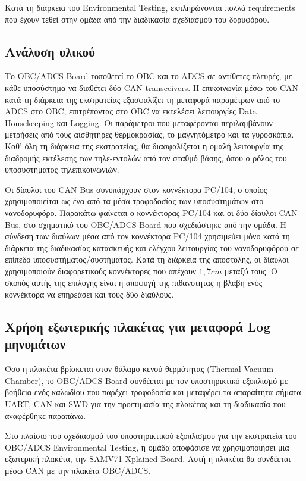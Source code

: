 \documentclass[a4paper,nobib,justified]{tufte-book}
\begin{document}
Κατά τη διάρκεια του Environmental Testing, εκπληρώνονται πολλά requirements που έχουν τεθεί στην ομάδα από την διαδικασία σχεδιασμού του δορυφόρου.
\subsection{Ανάλυση υλικού}
Το OBC/ADCS Board τοποθετεί το OBC και το ADCS σε αντίθετες πλευρές, με κάθε υποσύστημα να διαθέτει δύο CAN transceivers. Η επικοινωνία μέσω του CAN κατά τη διάρκεια της εκστρατείας εξασφαλίζει τη μεταφορά παραμέτρων από το ADCS στο OBC, επιτρέποντας στο OBC να εκτελέσει λειτουργίες Data Housekeeping και Logging. Οι παράμετροι που μεταφέρονται περιλαμβάνουν μετρήσεις από τους αισθητήρες θερμοκρασίας, το μαγνητόμετρο και τα γυροσκόπια. Καθ' όλη τη διάρκεια της εκστρατείας, θα διασφαλίζεται η ομαλή λειτουργία της διαδρομής εκτέλεσης των τηλε-εντολών από τον σταθμό βάσης, όπου ο ρόλος του υποσυστήματος τηλεπικοινωνιών.

Οι δίαυλοι του CAN Bus συνυπάρχουν στον κοννέκτορα PC/104, ο οποίος χρησιμοποιείται ως ένα από τα μέσα τροφοδοσίας των υποσυστημάτων στο νανοδορυφόρο. Παρακάτω φαίνεται ο κοννέκτορας PC/104 και οι δύο δίαυλοι CAN Bus, στο σχηματικό του OBC/ADCS Board που σχεδιάστηκε από την ομάδα. Η σύνδεση των διαύλων μέσα από τον κοννέκτορα PC/104 χρησιμεύει μόνο κατά τη διάρκεια της διαδικασίας κατασκευής και ελέγχου λειτουργίας του νανοδορυφόρου σε επίπεδο υποσυστήματος/συστήματος. Κατά τη διάρκεια της αποστολής, οι δίαυλοι χρησιμοποιούν διαφορετικούς κοννέκτορες που απέχουν $1,7cm$ μεταξύ τους. Ο σκοπός αυτής της επιλογής είναι η αποφυγή της πιθανότητας η βλάβη ενός κοννέκτορα να επηρεάσει και τους δύο διαύλους. 

\subsection{Χρήση εξωτερικής πλακέτας για μεταφορά Log μηνυμάτων}
Όσο η πλακέτα βρίσκεται στον θάλαμο κενού-θερμότητας (Thermal-Vacuum Chamber), το OBC/ADCS Board συνδέεται με τον υποστηρικτικό εξοπλισμό με βοήθεια ενός καλωδίου που παρέχει τροφοδοσία και μεταφέρει τα απαραίτητα σήματα UART, CAN και SWD για την προετιμασία της πλακέτας και τη διαδικασία που αναφέρθηκε παραπάνω.

Στο πλαίσιο του σχεδιασμού του υποστηρικτικού εξοπλισμού για την εκστρατεία του OBC/ADCS Environmental Testing, η ομάδα αποφάσισε να χρησιμοποιήσει μια εξωτερική πλακέτα, την SAMV71 Xplained Board. Αυτή η πλακέτα θα συνδέεται μέσω CAN με την πλακέτα OBC/ADCS. 
\end{document}

